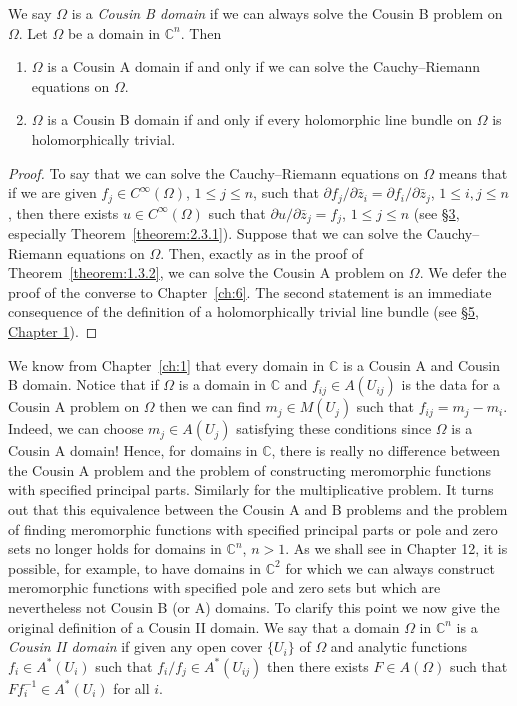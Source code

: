 We say $\Omega$ is a \emph{Cousin B domain} if we can always solve the Cousin B problem on $\Omega$.
 Let $\Omega$ be a domain in $\mathbb C^n$. Then
\begin{enumerate}
\item $\Omega$ is a Cousin A domain if and only if we can solve the Cauchy--Riemann equations on $\Omega$.
\item $\Omega$ is a Cousin B domain if and only if every holomorphic line bundle on $\Omega$ is holomorphically trivial.
\end{enumerate}
\begin{proof}
To say that we can solve the Cauchy--Riemann equations on $\Omega$ means that if we are given $f_j\in C^\infty(\Omega)$, $1\leq j\leq n$, such that $\partial f_j/\partial\bar z_i=\partial f_i/\partial\bar z_j$, $1\leq i,j\leq n$, then there exists $u\in C^\infty(\Omega)$ such that $\partial u/\partial\bar z_j=f_j$, $1\leq j\leq n$ (see \hyperref[sec:2:3]{\S3}, especially Theorem~\ref{theorem:2.3.1}). Suppose that we can solve the Cauchy--Riemann equations on $\Omega$. Then, exactly as in the proof of Theorem~\ref{theorem:1.3.2}, we can solve the Cousin A problem on $\Omega$. We defer the proof of the converse to Chapter~\ref{ch:6}. The second statement is an immediate consequence of the definition of a holomorphically trivial line bundle (see \hyperref[sec:1:5]{\S5, Chapter 1}).
\end{proof}
We know from Chapter~\ref{ch:1} that every domain in $\mathbb C$ is a Cousin A and Cousin B domain. Notice that if $\Omega$ is a domain in $\mathbb C$ and $f_{ij}\in A(U_{ij})$ is the data for a Cousin A problem on $\Omega$ then we can find $m_j\in M(U_j)$ such that $f_{ij}=m_j-m_i$. Indeed, we can choose $m_j\in A(U_j)$ satisfying these conditions since $\Omega$ is a Cousin A domain! Hence, for domains in $\mathbb C$, there is really no difference between the Cousin A problem and the problem of constructing meromorphic functions with specified principal parts. Similarly for the multiplicative problem. It turns out that this equivalence between the Cousin A and B problems and the problem of finding meromorphic functions with specified principal parts or pole and zero sets no longer holds for domains in $\mathbb C^n$, $n>1$. As we shall see in Chapter 12, it is possible, for example, to have domains in $\mathbb C^2$ for which we can always construct meromorphic functions with specified pole and zero sets but which are nevertheless not Cousin B (or A) domains. To clarify this point we now give the original definition of a Cousin II domain.
 We say that a domain $\Omega$ in $\mathbb C^n$ is a \emph{Cousin II domain} if given any open cover $\{U_i\}$ of $\Omega$ and analytic functions $f_i\in A^*(U_i)$ such that $f_i/f_j\in A^*(U_{ij})$ then there exists $F\in A(\Omega)$ such that $Ff_i^{-1}\in A^*(U_i)$ for all $i$.
